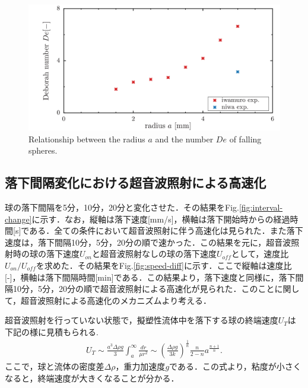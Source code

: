 \begin{figure}[ht]
    \begin{center}
        \includegraphics[width=15cm,clip]{5-Discussion/Deborah.png}
        \caption{Relationship between the radius $a$ and the number $De$ of falling spheres.}
        \label{fig:a-Degraph}
    \end{center}
\end{figure}

\clearpage

\subsection{落下間隔変化における超音波照射による高速化}

球の落下間隔を5分，10分，20分と変化させた．その結果をFig.\ref{fig:interval-change}に示す．なお，縦軸は落下速度[mm/s]，横軸は落下開始時からの経過時間[s]である．全ての条件において超音波照射に伴う高速化は見られた．また落下速度は，落下間隔10分，5分，20分の順で速かった．この結果を元に，超音波照射時の球の落下速度$U_{on}$と超音波照射なしの球の落下速度$U_{off}$として，速度比$U_{on}/U_{off}$を求めた．その結果をFig.\ref{fig:speed-diff}に示す．ここで縦軸は速度比[-]，横軸は落下間隔時間[min]である．この結果より，落下速度と同様に，落下間隔10分，5分，20分の順で超音波照射による高速化が見られた．このことに関して，超音波照射による高速化のメカニズムより考える．

超音波照射を行っていない状態で，擬塑性流体中を落下する球の終端速度$U_T$は下記の様に見積もられる\cite{ref:8}.
\begin{eqnarray}
    U_T \sim \frac{a^3\Delta\rho g}{3}  \int^{\infty}_{a} \frac{dr}{\mu r^2} \sim \left(\frac{\Delta \rho g}{3k}\right)^{\frac{1}{n}}\frac{n}{2-n}a^{\frac{n+1}{n}} .
    \label{eq:UT}
\end{eqnarray}
ここで，球と流体の密度差$\Delta \rho$，重力加速度$g$である．この式より，粘度が小さくなると，終端速度が大きくなることが分かる．

